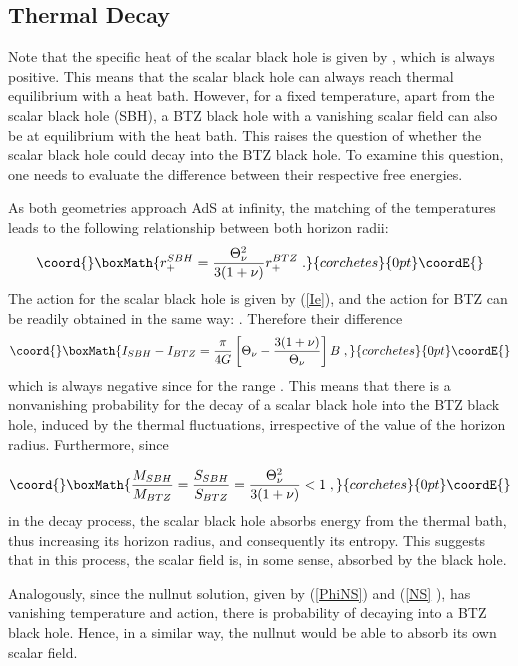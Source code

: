 \documentclass[a4paper,12pt]{article}
\begin{document}
\subsection{Thermal Decay}

Note that the specific heat of the scalar black hole is given by \coordHE{}, which is always positive. This means that
the scalar black hole can always reach thermal equilibrium with a heat bath.
However, for a fixed temperature, apart from the scalar black hole (SBH), a
BTZ black hole with a vanishing scalar field can also be at equilibrium with
the heat bath. This raises the question of whether the scalar black
hole could decay into the BTZ black hole. To examine this question, one
needs to evaluate the difference between their respective free energies.

As both geometries approach AdS at infinity, the matching of the
temperatures leads to the following relationship between both horizon radii:
\[\coord{}\boxMath{
r_{+}^{SBH}=\frac{\Theta _{\nu }^{2}}{3(1+\nu )}r_{+}^{BTZ}\;.
}{corchetes}{0pt}\coordE{}\]
The action for the scalar black hole is given by (\ref{Ie}), and the action
for BTZ can be readily obtained in the same way: \coordHE{}. Therefore their difference 
\[\coord{}\boxMath{
I_{SBH}-I_{BTZ}=\frac{\pi }{4G}\left[ \Theta _{\nu }-\frac{3(1+\nu )}{\Theta
_{\nu }}\right] B\;,
}{corchetes}{0pt}\coordE{}\]
which is always negative since \coordHE{} for the range \coordHE{}. This means that there is a nonvanishing
probability for the decay of a scalar black hole into the BTZ black hole,
induced by the thermal fluctuations, irrespective of the value of the
horizon radius. Furthermore, since

\[\coord{}\boxMath{
\frac{M_{SBH}}{M_{BTZ}}=\frac{S_{SBH}}{S_{BTZ}}=\frac{\Theta _{\nu }^{2}}{%
3(1+\nu )}<1\;,
}{corchetes}{0pt}\coordE{}\]
in the decay process, the scalar black hole absorbs energy from the thermal
bath, thus increasing its horizon radius, and consequently its entropy. This
suggests that in this process, the scalar field is, in some sense, absorbed
by the black hole.

Analogously, since the nullnut solution, given by (\ref{PhiNS}) and (\ref{NS}%
), has vanishing temperature and action, there is probability of decaying
into a BTZ black hole. Hence, in a similar way, the nullnut would be able to
absorb its own scalar field.
\end{document}
